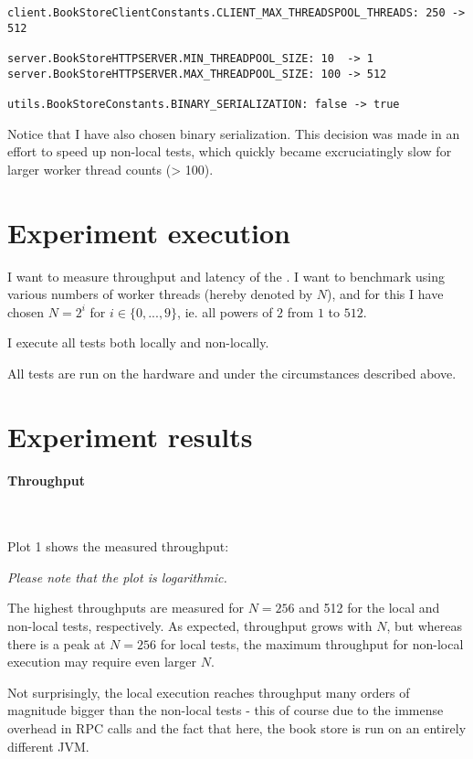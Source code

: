 \begin{verbatim}
client.BookStoreClientConstants.CLIENT_MAX_THREADSPOOL_THREADS: 250 -> 512

server.BookStoreHTTPSERVER.MIN_THREADPOOL_SIZE: 10  -> 1
server.BookStoreHTTPSERVER.MAX_THREADPOOL_SIZE: 100 -> 512

utils.BookStoreConstants.BINARY_SERIALIZATION: false -> true
\end{verbatim}

Notice that I have also chosen binary serialization. This decision was made in
an effort to speed up non-local tests, which quickly became excruciatingly slow
for larger worker thread counts (> 100).

\streg

\section{Experiment execution}

I want to measure throughput and latency of the . I want to
benchmark using various numbers of worker threads (hereby denoted by $N$), and
for this I have chosen $N = 2^i$ for $i \in \{0, ..., 9\}$, ie. all powers of
$2$ from $1$ to $512$. \medskip

I execute all tests both locally and non-locally. \medskip

All tests are run on the hardware and under the circumstances described above.

\section{Experiment results}

\paragraph{Throughput}~\smallskip

Plot 1 shows the measured throughput:


\textit{Please note that the plot is logarithmic.}\medskip

The highest throughputs are measured for $N = 256$ and 512 for the local and
non-local tests, respectively. As expected, throughput grows with $N$, but
whereas there is a peak at $N = 256$ for local tests, the maximum throughput for
non-local execution may require even larger $N$. \medskip

Not surprisingly, the local execution reaches throughput many orders of
magnitude bigger than the non-local tests - this of course due to the immense
overhead in RPC calls and the fact that here, the book store is run on an
entirely different JVM.

